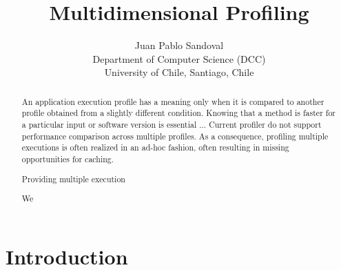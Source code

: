 \documentclass{sig-alternate}
\newcommand{\Title}{Multidimensional Profiling}
\newcommand{\TitleShort}{\Title}
\newcommand{\Authors}{Juan Pablo Sandoval}
\newcommand{\AuthorsShort}{J. P. Sandoval}
\newcommand{\seclabel}[1]{\label{sec:#1}}
\begin{document}
\title{\Title}

\author{\Authors\\[3mm]
Department of Computer Science (DCC)\\ University of Chile, Santiago, Chile\\[1 ex]
} 

\maketitle


\begin{abstract}
An application execution profile has a meaning only when it is compared to another profile obtained from a slightly different condition. Knowing that a method is faster for a particular input or software version is essential ...
Current profiler do not support performance comparison across multiple profiles. 
As a consequence, profiling multiple executions is often realized in an ad-hoc fashion, often resulting in missing opportunities for caching.

Providing multiple execution 

We 


%

\end{abstract}

\section{Introduction}\seclabel{problem}
\end{document}
